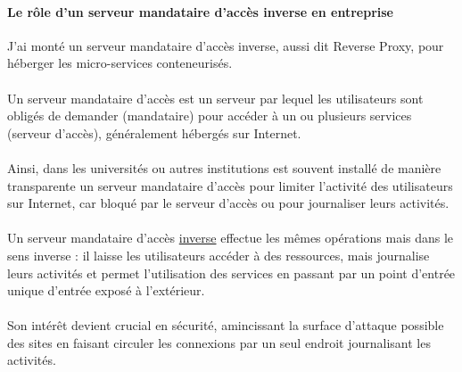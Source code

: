 \paragraph{Le rôle d'un serveur mandataire d'accès inverse en entreprise}

J'ai monté un serveur mandataire d'accès inverse, aussi dit Reverse Proxy, pour héberger les micro-services conteneurisés.
\\ \\
Un serveur mandataire d'accès est un serveur par lequel les utilisateurs sont obligés de demander (mandataire) pour accéder à un ou plusieurs services (serveur d'accès), généralement hébergés sur Internet.
\\ \\
Ainsi, dans les universités ou autres institutions est souvent installé de manière transparente un serveur mandataire d'accès pour limiter l'activité des utilisateurs sur Internet, car bloqué par le serveur d'accès ou pour journaliser leurs activités.
\\ \\
Un serveur mandataire d'accès \underline{inverse} effectue les mêmes opérations mais dans le sens inverse : il laisse les utilisateurs accéder à des ressources, mais journalise leurs activités et permet l'utilisation des services en passant par un point d'entrée unique d'entrée exposé à l'extérieur.
\\ \\
Son intérêt devient crucial en sécurité, amincissant la surface d'attaque possible des sites en faisant circuler les connexions par un seul endroit journalisant les activités.

